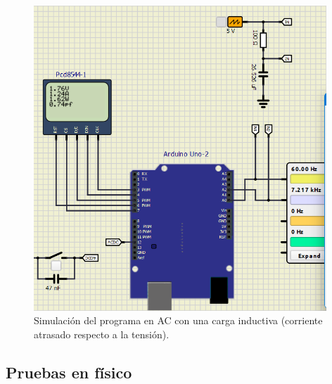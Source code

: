 \begin{figure}[h]
    \centering
    \includegraphics[width=11cm]{Imagenes/sim-inductive.png}
    \caption{Simulación del programa en AC con una carga inductiva (corriente atrasado respecto a la tensión).}
    \label{sim-ind}
\end{figure}
\FloatBarrier

\subsection{Pruebas en físico}
